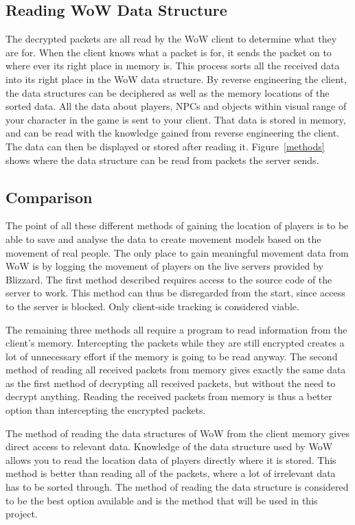 \subsection{Reading WoW Data Structure}
The decrypted packets are all read by the WoW client to determine what they are for. When the client knows what a packet is for, it sends the packet on to where ever its right place in memory is. This process sorts all the received data into its right place in the WoW data structure. By reverse engineering the client, the data structures can be deciphered as well as the memory locations of the sorted data. All the data about players, NPCs and objects within visual range of your character in the game is sent to your client. That data is stored in memory, and can be read with the knowledge gained from reverse engineering the client. The data can then be displayed or stored after reading it. Figure~\ref{methods} shows where the data structure can be read from packets the server sends.

\subsection{Comparison}
The point of all these different methods of gaining the location of players is to be able to save and analyse the data to create movement models based on the movement of real people. The only place to gain meaningful movement data from WoW is by logging the movement of players on the live servers provided by Blizzard. 
The first method described requires access to the source code of the server to work. This method can thus be disregarded from the start, since access to the server is blocked. Only client-side tracking is considered viable.

The remaining three methods all require a program to read information from the client's memory. Intercepting the packets while they are still encrypted creates a lot of unnecessary effort if the memory is going to be read anyway. The second method of reading all received packets from memory gives exactly the same data as the first method of decrypting all received packets, but without the need to decrypt anything. Reading the received packets from memory is thus a better option than intercepting the encrypted packets. 

The method of reading the data structures of WoW from the client memory gives direct access to relevant data. Knowledge of the data structure used by WoW allows you to read the location data of players directly where it is stored. This method is better than reading all of the packets, where a lot of irrelevant data has to be sorted through. The method of reading the data structure is considered to be the best option available and is the method that will be used in this project.

